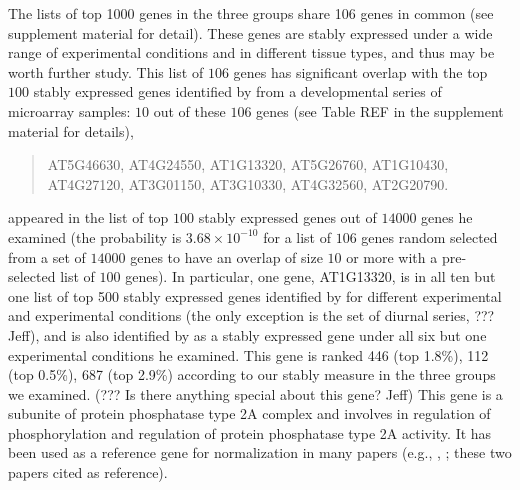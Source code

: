 \documentclass[11pt, a4paper]{article}
\begin{document}
The lists of top 1000 genes in the three groups share 106 genes in common (see supplement material for detail).  These
genes are stably expressed under a wide range of experimental conditions and
in different tissue types, and thus may be worth further study. This list of
$106$ genes has significant overlap with the top $100$ stably expressed genes
identified by \cite{czechowski2005genome} from a developmental series of
microarray samples: $10$ out of these $106$ genes (see Table REF in the
supplement material for details),
\begin{center}
\begin{quote}
	AT5G46630, AT4G24550, AT1G13320, AT5G26760, AT1G10430, \\
	AT4G27120, AT3G01150, AT3G10330, AT4G32560, AT2G20790.
\end{quote}
\end{center}
appeared in the list of top $100$ stably expressed genes
out of $14000$ genes he examined (the probability is $3.68\times10^{-10}$ for
a list of $106$ genes random selected from a set of $14000$ genes to have an
overlap of size $10$ or more with a pre-selected list of $100$ genes). In
particular, one gene, AT1G13320, is in all ten but one list of top 500 stably
expressed genes identified by \cite{czechowski2005genome} for different
experimental and experimental conditions (the only exception is the set of
diurnal series, ??? Jeff), and is also identified by
\cite{hong2010identification} as a stably expressed gene under all six but one
experimental conditions he examined.  This gene is ranked 446 (top 1.8\%), 112
(top 0.5\%), 687 (top 2.9\%) according to our stably measure in the three
groups we examined.  (??? Is there anything special about this gene? Jeff)
This gene is a subunite of protein phosphatase type 2A complex and involves in
regulation of phosphorylation and regulation of protein phosphatase type 2A
activity. It has been used as a reference gene for normalization in many
papers (e.g., \cite{bournier2013arabidopsis}, \cite{baron2012transcriptional};
these two papers cited \cite{czechowski2005genome} as reference). 

\end{document}
